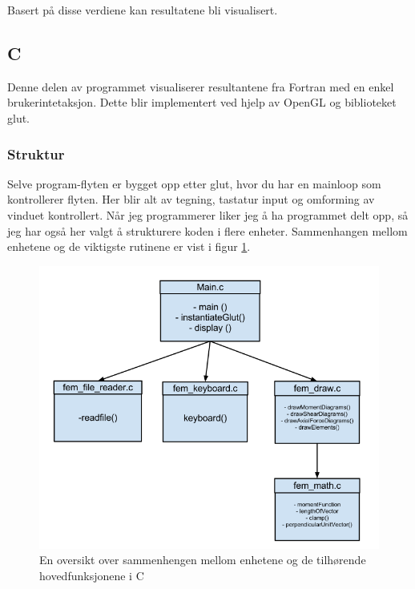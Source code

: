 \documentclass[10pt,a4paper, norsk]{article}
\begin{document}
Basert på disse  verdiene kan resultatene bli visualisert.


\subsection{C}
Denne delen av programmet visualiserer resultantene fra Fortran med en enkel brukerintetaksjon. Dette blir implementert ved hjelp av OpenGL og biblioteket glut. 

\subsubsection{Struktur}
Selve program-flyten er bygget opp etter glut, hvor du har en mainloop som kontrollerer flyten. Her blir alt av tegning, tastatur input og omforming av vinduet kontrollert. Når jeg programmerer liker jeg å ha programmet delt opp, så jeg har også her valgt å strukturere koden i flere enheter. 
Sammenhangen mellom enhetene og de viktigste rutinene er vist i 
 figur \ref{fig:cStruktur}.

\begin{figure}[h] 
\centering
\includegraphics[scale=0.35]{CStructure.png} 
\caption{En oversikt over sammenhengen mellom enhetene og de tilhørende hovedfunksjonene i C}
\label{fig:cStruktur}
\end{figure}     
\end{document}

